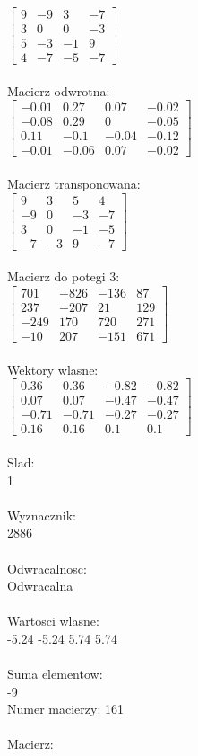 \documentclass[a4paper,12pt]{article}
\begin{document}
$\begin{bmatrix} 9&-9&3&-7\\3&0&0&-3\\5&-3&-1&9\\4&-7&-5&-7 \end{bmatrix}$
\\
\\
Macierz odwrotna:\\

$\begin{bmatrix} -0.01&0.27&0.07&-0.02\\-0.08&0.29&0&-0.05\\0.11&-0.1&-0.04&-0.12\\-0.01&-0.06&0.07&-0.02 \end{bmatrix}$
\\
\\
Macierz transponowana:\\

$\begin{bmatrix} 9&3&5&4\\-9&0&-3&-7\\3&0&-1&-5\\-7&-3&9&-7 \end{bmatrix}$
\\
\\
Macierz do potegi 3:\\

$\begin{bmatrix} 701&-826&-136&87\\237&-207&21&129\\-249&170&720&271\\-10&207&-151&671 \end{bmatrix}$
\\
\\
Wektory wlasne:\\

$\begin{bmatrix} 0.36&0.36&-0.82&-0.82\\0.07&0.07&-0.47&-0.47\\-0.71&-0.71&-0.27&-0.27\\0.16&0.16&0.1&0.1 \end{bmatrix}$
\\
\\
Slad:\\
1
\\
\\
Wyznacznik:\\
2886
\\
\\
Odwracalnosc:\\
Odwracalna
\\
\\
Wartosci wlasne:\\
-5.24 -5.24 5.74 5.74
\\
\\
Suma elementow:\\
-9
\\
\newpage
Numer macierzy:
161
\\
\\
Macierz:\\
\end{document}
